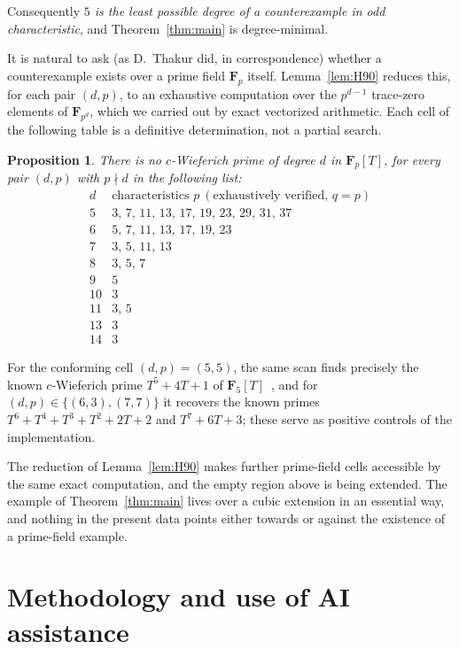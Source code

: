 \documentclass[11pt]{amsart}
\newcommand{\F}{\mathbf{F}}
\theoremstyle{plain}
\newtheorem{proposition}[theorem]{Proposition}
\theoremstyle{definition}
\begin{document}
Consequently \emph{$5$ is the least possible degree of a counterexample in odd
characteristic}, and Theorem~\ref{thm:main} is degree-minimal.

It is natural to ask (as D.~Thakur did, in correspondence) whether a
counterexample exists over a prime field $\F_p$ itself. Lemma~\ref{lem:H90}
reduces this, for each pair $(d,p)$, to an exhaustive computation over the
$p^{d-1}$ trace-zero elements of $\F_{p^d}$, which we carried out by exact
vectorized arithmetic. Each cell of the following table is a definitive
determination, not a partial search.

\begin{proposition}\label{prop:grid}
There is no $c$-Wieferich prime of degree $d$ in $\F_p[T]$, for every pair
$(d,p)$ with $p\nmid d$ in the following list:
\[
\begin{array}{c|l}
d & \text{characteristics }p\ (\text{exhaustively verified, }q=p)\\\hline
5 & 3,\,7,\,11,\,13,\,17,\,19,\,23,\,29,\,31,\,37\\
6 & 5,\,7,\,11,\,13,\,17,\,19,\,23\\
7 & 3,\,5,\,11,\,13\\
8 & 3,\,5,\,7\\
9 & 5\\
10 & 3\\
11 & 3,\,5\\
13 & 3\\
14 & 3
\end{array}
\]
\end{proposition}

For the conforming cell $(d,p)=(5,5)$, the same scan finds precisely the known
$c$-Wieferich prime $T^5+4T+1$ of $\F_5[T]$~\cite{BB}, and for
$(d,p)\in\{(6,3),(7,7)\}$ it recovers the known primes
$T^6+T^4+T^3+T^2+2T+2$ and $T^7+6T+3$; these serve as positive controls of the
implementation.

The reduction of Lemma~\ref{lem:H90} makes further prime-field cells accessible
by the same exact computation, and the empty region above is being extended.
The example of Theorem~\ref{thm:main} lives over a cubic extension in an
essential way, and nothing in the present data points either towards or against
the existence of a prime-field example.

\section{Methodology and use of AI assistance}\label{sec:method}
\end{document}
